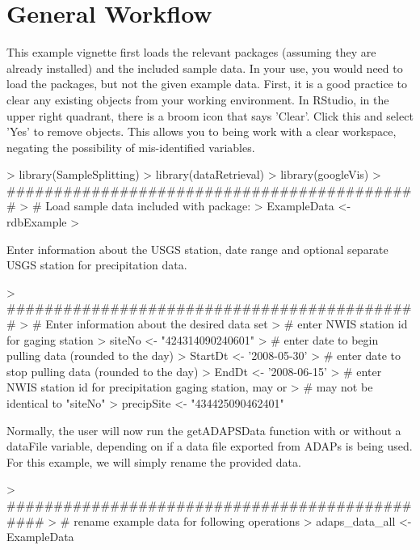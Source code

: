 \documentclass[a4paper,11pt]{article}
\begin{document}
\section{General Workflow}

This example vignette first loads the relevant packages (assuming they are already installed) and the included sample data. In your use, you would need to load the packages, but not the given example data.
First, it is a good practice to clear any existing objects from your working environment. In RStudio, in the upper right quadrant, there is a broom icon that says 'Clear'. Click this and select 'Yes' to remove objects. This allows you to being work with a clear workspace, negating the possibility of mis-identified variables. 

\begin{Schunk}
\begin{Sinput}
> library(SampleSplitting)
> library(dataRetrieval)
> library(googleVis)
> ############################################
> # Load sample data included with package:
> ExampleData <- rdbExample
> 
\end{Sinput}
\end{Schunk}

Enter information about the USGS station, date range and optional separate USGS station for precipitation data.

\begin{Schunk}
\begin{Sinput}
> ############################################
> # Enter information about the desired data set
> # enter NWIS station id for gaging station
> siteNo <- "424314090240601"
> # enter date to begin pulling data (rounded to the day)
> StartDt <- '2008-05-30'
> # enter date to stop pulling data (rounded to the day)
> EndDt <- '2008-06-15'
> # enter NWIS station id for precipitation gaging station, may or 
> # may not be identical to "siteNo"
> precipSite <- "434425090462401"
\end{Sinput}
\end{Schunk}

Normally, the user will now run the getADAPSData function with or without a dataFile variable, depending on if a data file exported from ADAPs is being used. For this example, we will simply rename the provided data.

\begin{Schunk}
\begin{Sinput}
> ###############################################
> # rename example data for following operations
> adaps_data_all <- ExampleData
\end{Sinput}
\end{Schunk}
\end{document}

